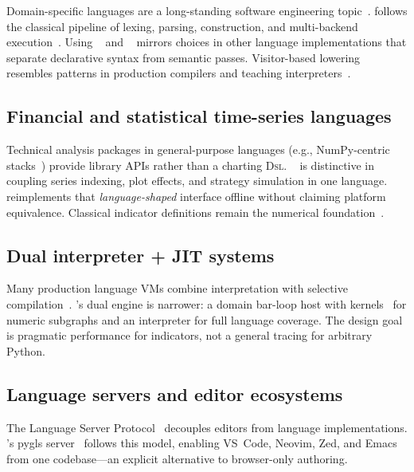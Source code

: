 \documentclass[11pt,a4paper]{article}
\begin{document}
Domain-specific languages are a long-standing software engineering
topic~\citep{hudak1996dsl,fowler2010dsl,erwig2011dsl}.
\pyne{} follows the classical pipeline of lexing, parsing, \ast{}
construction, and multi-backend execution~\citep{aho2006dragon,cooper2011engineering,muchnick1997advanced}.
Using \antlr{}~\citep{parr2013antlr} and \asdl{}~\citep{wang1997asdl} mirrors
choices in other language implementations that separate declarative syntax
from semantic passes.
Visitor-based lowering resembles patterns in production compilers and teaching
interpreters~\citep{gamma1994design,nystrom2021crafting}.

\subsection{Financial and statistical time-series languages}
\label{sec:rw-fin}

Technical analysis packages in general-purpose languages (e.g., NumPy-centric
stacks~\citep{harris2020numpy,brooks2015python}) provide library APIs rather
than a charting \textsc{Dsl}.
\pine{}~\citep{tradingview-pine} is distinctive in coupling series indexing,
plot effects, and strategy simulation in one language.
\pyne{} reimplements that \emph{language-shaped} interface offline without
claiming platform equivalence.
Classical indicator definitions remain the numerical
foundation~\citep{wilder1978new,bollinger2001,murphy1999technical,kama1998kaufman}.

\subsection{Dual interpreter + JIT systems}
\label{sec:rw-jit}

Many production language VMs combine interpretation with selective
compilation~\citep{chambers1991iterative,peytonjones2003ghc,lattner2004llvm}.
\pyne{}'s dual engine is narrower: a domain bar-loop host with \numba{}
kernels~\citep{lam2015numba} for numeric subgraphs and an \ast{} interpreter
for full language coverage.
The design goal is pragmatic performance for indicators, not a general tracing
\jit{} for arbitrary Python.

\subsection{Language servers and editor ecosystems}
\label{sec:rw-lsp}

The Language Server Protocol~\citep{lsp2023,voutilainen2016lsp} decouples
editors from language implementations.
\pyne{}'s pygls server~\citep{murphy2020pygls} follows this model, enabling
VS~Code, Neovim, Zed, and Emacs from one codebase---an explicit alternative to
browser-only authoring.
\end{document}
